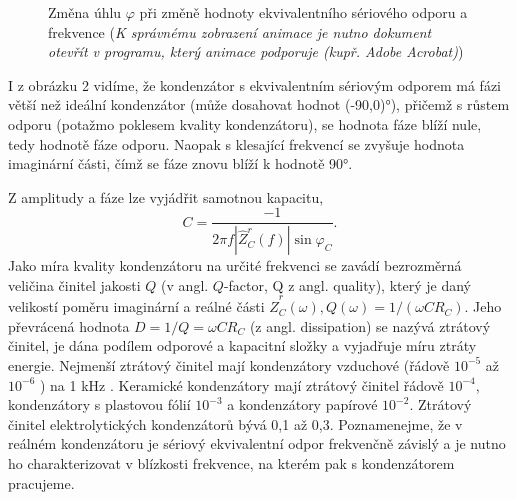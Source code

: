 \documentclass[czech,11pt,a4paper]{article}
\begin{document}
\begin{multicols}{2}
		\begin{figure}[H]
			\begin{center}
				\caption{Změna úhlu $\varphi$ při změně hodnoty ekvivalentního sériového odporu a frekvence (\textit{K správnému zobrazení animace je nutno dokument otevřít v programu, který animace podporuje (kupř. Adobe Acrobat)})}
				
			\end{center}
		\end{figure}		
		I z obrázku 2 vidíme, že kondenzátor s ekvivalentním sériovým odporem má fázi větší než ideální kondenzátor (může dosahovat hodnot (-90,0)°), přičemž s růstem odporu (potažmo poklesem kvality kondenzátoru), se hodnota fáze blíží nule, tedy hodnotě fáze odporu. Naopak s klesající frekvencí se zvyšuje hodnota imaginární části, čímž se fáze znovu blíží k hodnotě 90°.
		
		Z amplitudy a fáze lze vyjádřit samotnou kapacitu,
		\begin{equation}
			C=\frac{-1}{2 \pi f\left|\hat{Z}_{C}^{r}(f)\right| \sin \varphi_{C}}.
		\end{equation}		
		Jako míra kvality kondenzátoru na určité frekvenci se zavádí bezrozměrná veličina činitel jakosti $Q$ (v angl. $Q$-factor, Q z angl. quality), který je daný velikostí poměru imaginární a reálné části $\hat{Z}_{C}^{r}(\omega), Q(\omega)=1 /\left(\omega C R_{C}\right)$. Jeho převrácená hodnota $D=1 / Q=\omega C R_{C}$ (z angl. dissipation) se nazývá ztrátový činitel, je dána podílem odporové a kapacitní složky a vyjadřuje míru ztráty energie. Nejmenší ztrátový činitel mají kondenzátory vzduchové (řádově $10^{-5}$ až $10^{-6}$ ) na 1 kHz . Keramické kondenzátory mají ztrátový činitel řádově $10^{-4}$, kondenzátory s plastovou fólií $10^{-3}$ a kondenzátory papírové $10^{-2}$. Ztrátový činitel elektrolytických kondenzátorů bývá 0,1 až 0,3. Poznamenejme, že v reálném kondenzátoru je sériový ekvivalentní odpor frekvenčně závislý a je nutno ho charakterizovat v blízkosti frekvence, na kterém pak s kondenzátorem pracujeme.

\end{multicols}
\end{document}

